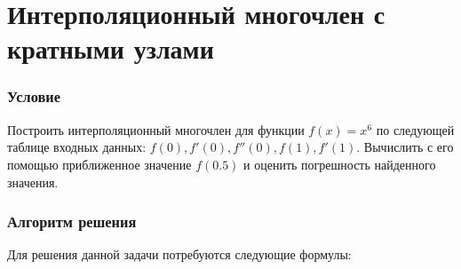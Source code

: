 \documentclass[a4paper, 12pt]{article}
\begin{document}
	\section*{Интерполяционный многочлен с кратными узлами}
	\subsubsection*{Условие}
	Построить интерполяционный многочлен для функции $f(x) = x^6$ по следующей таблице входных данных: $f(0), f'(0), f''(0), f(1), f'(1)$. Вычислить с его помощью приближенное значение $f(0.5)$ и оценить погрешность найденного значения.
	\subsubsection*{Алгоритм решения}
	Для решения данной задачи потребуются следующие формулы:
\end{document}
